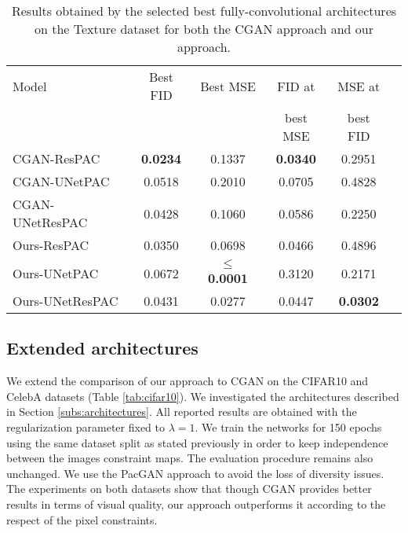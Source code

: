 \begin{table}[t]
	\centering
	\begin{tabular}{|l|c|c|c|c|c|}
		\hline
		Model           & Best FID & Best MSE & FID at & MSE at \\
		&&&best MSE & best FID  \\
		\hline
		CGAN-ResPAC &   \textbf{0.0234} & 0.1337 &  \textbf{0.0340} & 0.2951 \\
		CGAN-UNetPAC &  0.0518 & 0.2010 & 0.0705 & 0.4828\\
		CGAN-UNetResPAC & 0.0428 & 0.1060 & 0.0586 & 0.2250\\
		\hline
		Ours-ResPAC &  0.0350 & 0.0698 & 0.0466 & 0.4896\\
		Ours-UNetPAC &  0.0672 & \textbf{$\leq$ 0.0001}  & 0.3120 & 0.2171 \\
		Ours-UNetResPAC & 0.0431 & 0.0277 &0.0447 & \textbf{0.0302}\\
		\hline
	\end{tabular}
	
	\caption{Results obtained by the selected best fully-convolutional architectures on the Texture dataset for both the CGAN approach and our approach.}
	\label{tab:ablation-cgan}
\end{table}

\subsection{Extended architectures}
We extend the comparison of our approach to CGAN on the CIFAR10 and CelebA  datasets (Table \ref{tab:cifar10}). We investigated the architectures described in Section \ref{subs:architectures}. All reported results are obtained with the regularization parameter fixed to $\lambda=1$.
We train the networks for 150 epochs using the same dataset split as stated previously in order to keep independence between the images constraint maps. The evaluation procedure remains also unchanged. We use the PacGAN approach to avoid the loss of diversity issues. The experiments on both datasets show that though CGAN  provides better results in terms of visual quality, our approach outperforms it according to the respect of the pixel constraints.


